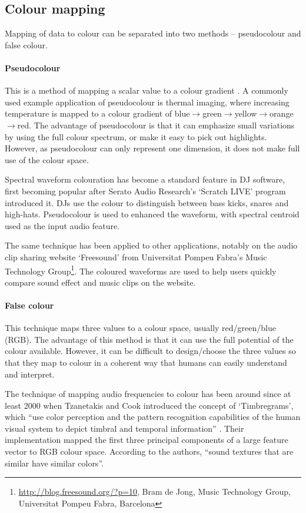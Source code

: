 \subsection{Colour mapping}\label{sec:litreviewcolour}
Mapping of data to colour can be separated into two methods -- pseudocolour and
false colour.

\paragraph{Pseudocolour}
This is a method of mapping a scalar value to a colour gradient
\cite{Moreland2009}. A commonly used example application of pseudocolour is
thermal imaging, where increasing temperature is mapped to a colour gradient of
blue$\to$green$\to$yellow$\to$orange$\to$red. The advantage of pseudocolour is
that it can emphasize small variations by using the full colour spectrum, or
make it easy to pick out highlights. However, as pseudocolour can only
represent one dimension, it does not make full use of the colour space.

Spectral waveform colouration has become a standard feature in DJ software,
first becoming popular after Serato Audio Research's `Scratch LIVE' program
introduced it.  DJs use the colour to distinguish between bass kicks, snares
and high-hats. Pseudocolour is used to enhanced the waveform, with spectral
centroid used as the input audio feature.

The same technique has been applied to other applications, notably on the audio
clip sharing website `Freesound' from Universitat Pompeu Fabra's Music
Technology Group\footnote{\url{http://blog.freesound.org/?p=10}, Bram de Jong,
  Music Technology Group, Universitat Pompeu Fabra, Barcelona}. The coloured
waveforms are used to help users quickly compare sound effect and music clips
on the website.

\paragraph{False colour}
This technique maps three values to a colour space, usually red/green/blue
(RGB). The advantage of this method is that it can use the full potential of
the colour available. However, it can be difficult to design/choose the three
values so that they map to colour in a coherent way that humans can easily
understand and interpret.

The technique of mapping audio frequencies to colour has been around since at
least 2000 when Tzanetakis and Cook introduced the concept of `Timbregrams',
which ``use color perception and the pattern recognition capabilities of the
human visual system to depict timbral and temporal information''
\cite{Tzanetakis2000}. Their implementation mapped the first three principal
components of a large feature vector to RGB colour space. According to the
authors, ``sound textures that are similar have similar colors''.

